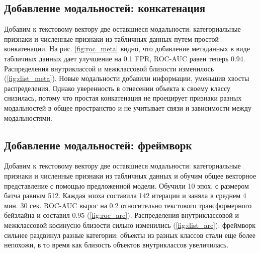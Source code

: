 \documentclass{article}
\begin{document}
\subsection{Добавление модальностей: конкатенация}
Добавим к текстовому вектору две оставшиеся модальности: категориальные признаки и численные признаки из табличных данных путем простой конкатенации. На рис. \ref{fig:roc_meta} видно, что добавление метаданных в виде табличных данных дает улучшение на 0.1 FPR, ROC-AUC равен теперь 0.94. Распределения внутриклассой и межклассовой близости изменилось (\ref{fig:dist_meta}). Новые модальности добавили информации, уменьшив хвосты распределения. Однако уверенность в отнесении объекта к своему классу снизилась, потому что простая конкатенация не проецирует признаки разных модальностей в общее пространство и не учитывает связи и зависимости между модальностями.

\subsection{Добавление модальностей: фреймворк}
Добавим к текстовому вектору две оставшиеся модальности: категориальные признаки и численные признаки из табличных данных и обучим общее векторное представление с помощью предложенной модели. Обучили 10 эпох, с размером батча равным 512. Каждая эпоха составила 142 итерации и заняла в среднем 4 мин. 30 сек.
ROC-AUC вырос на 0.2 относительно текстового трансформерного бейзлайна и составил 0.95 (\ref{fig:roc_arc}). Распределения внутриклассовой и межклассовой косинусно близости сильно изменились (\ref{fig:dist_arc}): фреймворк сильнее раздвинул разные категории: объекты из разных классов стали еще более непохожи, в то время как близость объектов внутриклассов увеличилась.
\end{document}
